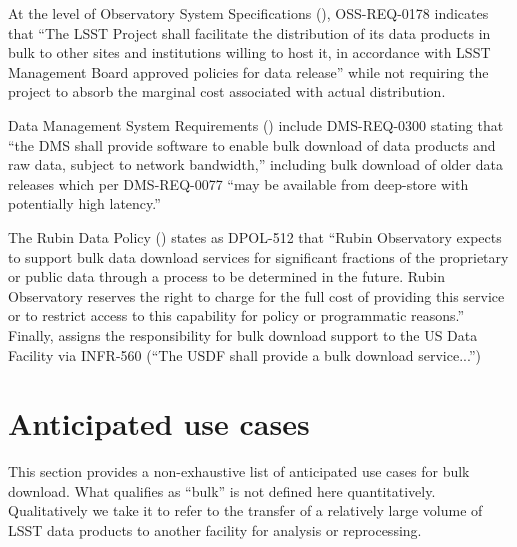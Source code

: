 At the level of Observatory System Specifications (), OSS-REQ-0178 indicates that ``The LSST Project shall facilitate the distribution of its data products in bulk to other sites and institutions willing to host it, in accordance with LSST Management Board approved policies for data release'' while not requiring the project to absorb the marginal cost associated with actual distribution.

Data Management System Requirements () include DMS-REQ-0300 stating that ``the DMS shall provide software to enable bulk download of data products and raw data, subject to network bandwidth,'' including bulk download of older data releases which per DMS-REQ-0077 ``may be available from deep-store with potentially high latency.''

The Rubin Data Policy () states as DPOL-512 that ``Rubin Observatory expects to support bulk data download
services for significant fractions of the proprietary or public data through a process to be determined in the future. Rubin Observatory reserves the right to charge for the full cost of providing this service or to restrict access to this capability for policy or programmatic reasons.'' Finally,  assigns the responsibility for bulk download support to the US Data Facility via INFR-560 (``The USDF shall provide a bulk download service...'')

\section{Anticipated use cases}

This section provides a non-exhaustive list of anticipated use cases for bulk download. What qualifies as ``bulk'' is not defined here quantitatively. Qualitatively we take it to refer to the transfer of a relatively large volume of LSST data products to another facility for analysis or reprocessing.

